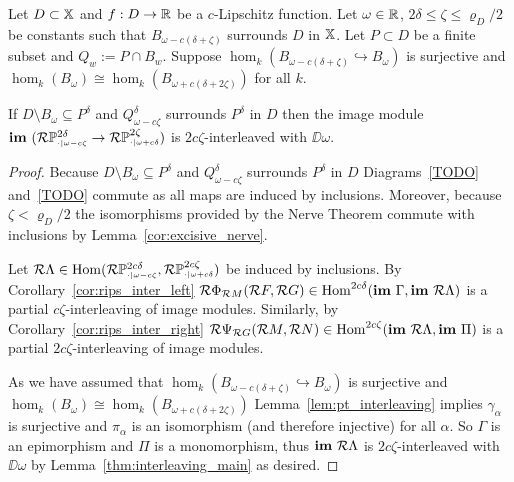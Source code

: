 \begin{theorem}
  Let $D\subset\mathbb{X}$ and $f : D\to\mathbb{R}$ be a $c$-Lipschitz function.
  Let $\omega\in\mathbb{R}$, $2\delta\leq\zeta\leq\varrho_D/2$ be constants such that $B_{\omega-c(\delta+\zeta)}$ surrounds $D$ in $\mathbb{X}$.
  Let $P\subset D$ be a finite subset and $Q_w := P\cap B_w$.
  Suppose $\hom_k(B_{\omega-c(\delta+\zeta)}\hookrightarrow B_\omega)$ is surjective and $\hom_k(B_\omega)\cong\hom_k(B_{\omega+c(\delta+2\zeta)})$ for all $k$.

  If $D\setminus B_\omega\subseteq P^\delta$ and $Q_{\omega-c\zeta}^\delta$ surrounds $P^\delta$ in $D$ then the image module $\mathbf{im}~(\mathcal{R}\mathbb{P}_{\scriptscriptstyle \cdot\mid \omega-c\zeta}^{2\delta}\to \mathcal{R}\mathbb{P}_{\scriptscriptstyle \cdot\mid \omega+c\delta}^{2\zeta})$ is $2c\zeta$-interleaved with $\DD{\omega}$.
\end{theorem}
\begin{proof}
  Because $D\setminus B_\omega\subseteq P^\delta$ and $Q_{\omega-c\zeta}^\delta$ surrounds $P^\delta$ in $D$ Diagrams~\ref{TODO} and~\ref{TODO} commute as all maps are induced by inclusions.
  Moreover, because $\zeta < \varrho_D/2$ the isomorphisms provided by the Nerve Theorem commute with inclusions by Lemma~\ref{cor:excisive_nerve}.

  Let $\mathcal{R}\Lambda \in\mathrm{Hom}(\mathcal{R}\mathbb{P}_{\scriptscriptstyle \cdot\mid \omega-c\zeta}^{2c\delta}, \mathcal{R}\mathbb{P}_{\scriptscriptstyle \cdot\mid \omega+c\delta}^{2c\zeta})$ be induced by inclusions.
  By Corollary~\ref{cor:rips_inter_left} $\mathcal{R} \Phi_{\mathcal{R} M}(\mathcal{R} F, \mathcal{R} G)\in\mathrm{Hom}^{2c\delta}(\mathbf{im}~\Gamma,\mathbf{im}~\mathcal{R}\Lambda)$ is a partial $c\zeta$-interleaving of image modules.
  Similarly, by Corollary~\ref{cor:rips_inter_right} $\mathcal{R} \Psi_{\mathcal{R} G} (\mathcal{R} M,\mathcal{R} N)\in\mathrm{Hom}^{2c\zeta}(\mathbf{im}~\mathcal{R}\Lambda, \mathbf{im}~\Pi)$ is a partial $2c\zeta$-interleaving of image modules.

  As we have assumed that $\hom_k(B_{\omega-c(\delta+\zeta)}\hookrightarrow B_\omega)$ is surjective and $\hom_k(B_\omega)\cong\hom_k(B_{\omega+c(\delta+2\zeta)})$ Lemma~\ref{lem:pt_interleaving} implies $\gamma_\alpha$ is surjective and $\pi_\alpha$ is an isomorphism (and therefore injective) for all $\alpha$.
  So $\Gamma$ is an epimorphism and $\Pi$ is a monomorphism, thus $\mathbf{im}~\mathcal{R}\Lambda$ is $2c\zeta$-interleaved with $\DD{\omega}$ by Lemma~\ref{thm:interleaving_main} as desired.
\end{proof}

